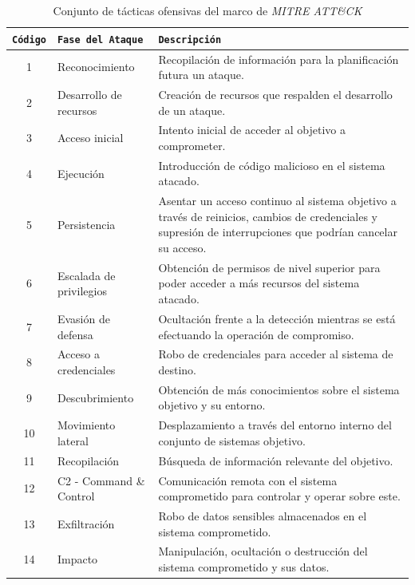 \begin{table}[H] 
\centering
\footnotesize
\begin{tabular}{|c|l|p{8cm}|}
\hline
\rowcolor{graylight}\texttt{Código} & \texttt{Fase del Ataque} & \texttt{Descripción} \\
\hline
1 & Reconocimiento & Recopilación de información para la planificación futura un ataque. \\
\hline
2 & Desarrollo de recursos & Creación de recursos que respalden el desarrollo de un ataque. \\
\hline
3 & Acceso inicial & Intento inicial de acceder al objetivo a comprometer. \\
\hline
4 & Ejecución & Introducción de código malicioso en el sistema atacado. \\
\hline
5 & Persistencia & Asentar un acceso continuo al sistema objetivo a través de reinicios, cambios de credenciales y supresión de interrupciones que podrían cancelar su acceso. \\
\hline
6 & Escalada de privilegios & Obtención de permisos de nivel superior para poder acceder a más recursos del sistema atacado. \\
\hline
7 & Evasión de defensa & Ocultación frente a la detección mientras se está efectuando la operación de compromiso. \\
\hline
8 & Acceso a credenciales & Robo de credenciales para acceder al sistema de destino. \\
\hline
9 & Descubrimiento & Obtención de más conocimientos sobre el sistema objetivo y su entorno. \\
\hline
10 & Movimiento lateral & Desplazamiento a través del entorno interno del conjunto de sistemas objetivo. \\
\hline
11 & Recopilación & Búsqueda de información relevante del objetivo. \\
\hline
12 & \gls{C2} - Command \& Control & Comunicación remota con el sistema comprometido para controlar y operar sobre este. \\
\hline
13 & Exfiltración & Robo de datos sensibles almacenados en el sistema comprometido. \\
\hline
14 & Impacto & Manipulación, ocultación o destrucción del sistema comprometido y sus datos. \\
\hline
\end{tabular}
\caption{Conjunto de tácticas ofensivas del marco de \textit{MITRE ATT\&CK}}
\label{tab:mitre_attack_phases}
\end{table}

